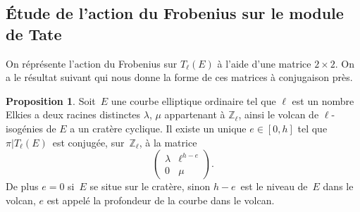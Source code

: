 \documentclass[10pt,a4paper]{book}
\theoremstyle{plain}
\theoremstyle{definition}
\theoremstyle{definition}
\theoremstyle{definition}
\newtheorem{prop}[thm]{Proposition}
\theoremstyle{definition}
\theoremstyle{remark}
\theoremstyle{remark}
\theoremstyle{definition}
\begin{document}
\subsection{\'Etude de l'action du Frobenius sur le module de Tate}
\label{subs:elk:dir}

On réprésente l'action du Frobenius sur $T_{\ell}(E)$ à l'aide d'une matrice $
2 \times 2$. On a le résultat suivant qui nous donne la forme de ces matrices à
conjugaison près.


\begin{prop}\label{pro:mat:fro}
Soit~$E$ une courbe elliptique ordinaire tel que $\ell$ est un nombre Elkies
a deux racines distinctes $\lambda$, $\mu$ appartenant à $\mathbb{Z}_{\ell}$,
ainsi le volcan de $\ell$-isogénies de $E$ a un cratère cyclique.
Il existe un unique $e \in [ 0, h]$
tel que $\pi|T_{\ell}(E)$~est conjugée, sur~$\mathbb{Z}_{\ell}$,
à la matrice 
\begin{equation*}
\left ( \begin{matrix}\lambda & \ell^{h-e} \\ 0 & \mu
\end{matrix}\right ).
\end{equation*}
De plus $e = 0$ si~$E$ se situe sur le cratère,
sinon $h - e$~est le niveau de~$E$ dans le volcan, $e$ est appelé la profondeur
de la courbe dans le volcan.
\end{prop}
\end{document}
